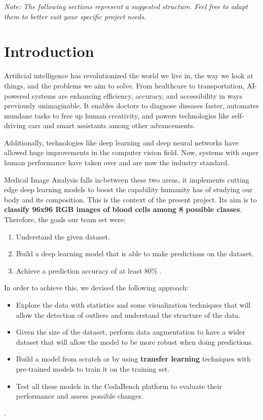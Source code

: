 \documentclass[11pt]{article}
\begin{document}
    \begin{multicols}{2}
        \noindent \textit{Note: The following sections  represent a suggested structure. Feel free to adapt them to better suit your specific project needs.}
        
        \section{Introduction}
        Artificial intelligence has revolutionized the world we live in, the way we look at things, and the problems we aim to solve. From healthcare to transportation, AI-powered systems are enhancing efficiency, accuracy, and accessibility in ways previously unimaginable. It enables doctors to diagnose diseases faster, automates mundane tasks to free up human creativity, and powers technologies like self-driving cars and smart assistants among other advancements. 
        \newline

        Additionally, technologies like deep learning and deep neural networks have allowed huge improvements in the computer vision field. Now, systems with super human performance have taken over and are now the industry standard.
        \newline
        
        Medical Image Analysis falls in-between these two areas, it implements cutting edge deep learning models to boost the capability humanity has of studying our body and its composition. This is the context of the present project. Its aim is to \textbf{classify 96x96 RGB images of blood cells among 8 possible classes}. Therefore, the goals our team set were; 
        \begin{enumerate}
            \item Understand the given dataset.
            \item Build a deep learning model that is able to make predictions on the dataset. 
            \item Achieve a prediction accuracy of at least 80\% .
        \end{enumerate}

        In order to achieve this, we devised the following approach:
        \begin{itemize}
            \item Explore the data with statistics and some visualization techniques that will allow the detection of outliers and understand the structure of the data.
            \item Given the size of the dataset, perform data augmentation to have a wider dataset that will allow the model to be more robust when doing predictions.
            \item Build a model from scratch or by using \textbf{transfer learning} techniques with pre-trained models to train it on the training set.
            \item Test all these models in the CodaBench platform to evaluate their performance and assess possible changes.
        \end{itemize}
        .


\end{multicols}
\end{document}
